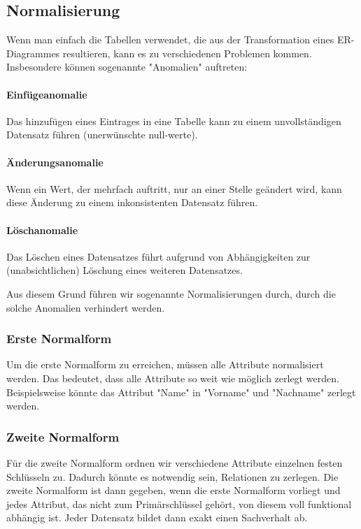 \documentclass{article}
\begin{document}
	\subsection{Normalisierung}
	Wenn man einfach die Tabellen verwendet, die aus der Transformation eines ER-Diagrammes resultieren, kann es zu verschiedenen Problemen kommen. Insbesondere können sogenannte "Anomalien" auftreten:

	\paragraph{Einfügeanomalie}
	Das hinzufügen eines Eintrages in eine Tabelle kann zu einem unvollständigen Datensatz führen (unerwünschte null-werte).

	\paragraph{Änderungsanomalie}
	Wenn ein Wert, der mehrfach auftritt, nur an einer Stelle geändert wird, kann diese Änderung zu einem inkonsistenten Datensatz führen.

	\paragraph{Löschanomalie}
	Das Löschen eines Datensatzes führt aufgrund von Abhängigkeiten zur (unabsichtlichen) Löschung eines weiteren Datensatzes.

	Aus diesem Grund führen wir sogenannte Normalisierungen durch, durch die solche Anomalien verhindert werden.

	\subsubsection{Erste Normalform}
	Um die erste Normalform zu erreichen, müssen alle Attribute normalisiert werden. Das bedeutet, dass alle Attribute so weit wie möglich zerlegt werden.
	Beispielsweise könnte das Attribut "Name" in "Vorname" und "Nachname" zerlegt werden.

	\subsubsection{Zweite Normalform}
	Für die zweite Normalform ordnen wir verschiedene Attribute einzelnen festen Schlüsseln zu. Dadurch könnte es notwendig sein, Relationen zu zerlegen. Die zweite Normalform ist dann gegeben, wenn die erste Normalform vorliegt und jedes Attribut, das nicht zum Primärschlüssel gehört, von diesem voll funktional abhängig ist. Jeder Datensatz bildet dann exakt einen Sachverhalt ab.
\end{document}
